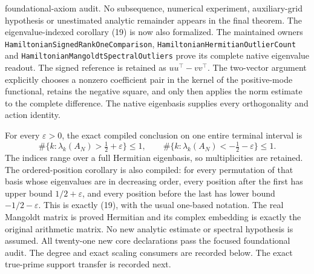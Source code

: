 foundational-axiom audit. No subsequence, numerical experiment,
auxiliary-grid hypothesis or unestimated analytic remainder appears
in the final theorem. The eigenvalue-indexed corollary (19) is now also formalized.
The maintained owners
\texttt{HamiltonianSignedRankOneComparison},
\texttt{HamiltonianHermitianOutlierCount} and
\texttt{HamiltonianMangoldtSpectralOutliers} prove its complete
native eigenvalue readout.
The signed reference is retained as \(uu^\top-vv^\top\).
The two-vector argument explicitly chooses a nonzero coefficient
pair in the kernel of the positive-mode functional, retains the
negative square, and only then applies the norm estimate to the
complete difference.
The native eigenbasis supplies every orthogonality and action
identity.

For every \(\varepsilon>0\), the exact compiled conclusion on one
entire terminal interval is
\[
 \#\{k:\lambda_k(A_N)>\tfrac12+\varepsilon\}\leq1,\qquad
 \#\{k:\lambda_k(A_N)<-\tfrac12-\varepsilon\}\leq1.
\]
The indices range over a full Hermitian eigenbasis, so multiplicities
are retained.
The ordered-position corollary is also compiled: for every
permutation of that basis whose eigenvalues are in decreasing
order, every position after the first has upper bound
\(1/2+\varepsilon\), and every position before the last has lower
bound \(-1/2-\varepsilon\).
This is exactly (19), with the usual one-based notation.
The real Mangoldt matrix is proved Hermitian and its complex
embedding is exactly the original arithmetic matrix.
No new analytic estimate or spectral hypothesis is assumed.
All twenty-one new core declarations pass the focused foundational
audit.
The degree and exact scaling consumers are recorded below.
The exact true-prime support transfer is recorded next.

